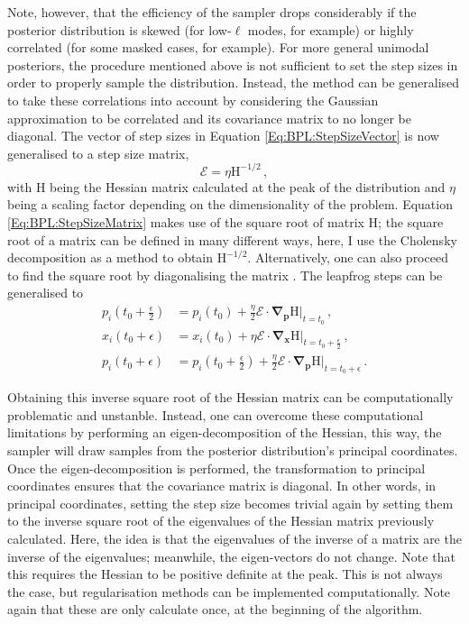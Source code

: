 \qquad Note, however, that the efficiency of the sampler drops considerably if the posterior distribution is skewed (for low-$\ell$ modes, for example) or highly correlated (for some masked cases, for example). For more general unimodal posteriors, the procedure mentioned above is not sufficient to set the step sizes in order to properly sample the distribution. Instead, the method can be generalised to take these correlations into account by considering the Gaussian approximation to be correlated and its covariance matrix to no longer be diagonal. The vector of step sizes in Equation \ref{Eq:BPL:StepSizeVector} is now generalised to a step size matrix, 
\begin{equation}
    \label{Eq:BPL:StepSizeMatrix}
    \bm{\mathcal{E}} = \eta \bm{\mathrm{H}}^{-1/2}\, ,
\end{equation}
with $\bm{\mathrm{H}}$ being the Hessian matrix calculated at the peak of the distribution and $\eta$ being a scaling factor depending on the dimensionality of the problem. Equation \ref{Eq:BPL:StepSizeMatrix} makes use of the square root of matrix $\bm{\mathrm{H}}$; the square root of a matrix can be defined in many different ways, here, I use the Cholensky decomposition \citep{Golub1996} as a method to obtain $\bm{\mathrm{H}}^{-1/2}$. Alternatively, one can also proceed to find the square root by diagonalising the matrix \citep{SreeThesis}.  The leapfrog steps can be generalised to
\begin{align}
\label{eqn::ch1_leap_forg_matrix_1}
p_i\left(t_0+\frac{\epsilon}{2}\right) & = p_i(t_0)+\frac{\eta}{2}\bm{\mathcal{E}}\cdot\mathbf{\nabla}_{\mathbf{p}}\bm{\mathrm{H}}\Big|_{t=t_0} \, ,\\
\label{eqn::ch1_leap_forg_matrix_2}
x_i(t_0+\epsilon) &= x_i(t_0)+\eta\bm{\mathcal{E}}\cdot\mathbf{\nabla}_{\mathbf{x}}\bm{\mathrm{H}}\Big|_{t=t_0+\frac{\epsilon}{2} }\, ,\\
\label{eqn::ch1_leap_forg_matrix_3}
p_i(t_0+\epsilon) & = p_i\left(t_0+\frac{\epsilon}{2}\right)+\frac{\eta}{2}\bm{\mathcal{E}}\cdot\mathbf{\nabla}_{\mathbf{p}}\bm{\mathrm{H}}\Big|_{t=t_0+\epsilon}\, .
\end{align}

\qquad Obtaining this inverse square root of the Hessian matrix can be computationally problematic and unstanble. Instead, one can overcome these computational limitations by performing an eigen-decomposition of the Hessian, this way, the sampler will draw samples from the posterior distribution's principal coordinates. Once the eigen-decomposition is performed, the transformation to principal coordinates ensures that the covariance matrix is diagonal. In other words, in principal coordinates, setting the step size becomes trivial again by setting them to the inverse square root of the eigenvalues of the Hessian matrix previously calculated. Here, the idea is that the eigenvalues of the inverse of a matrix are the inverse of the eigenvalues; meanwhile, the eigen-vectors do not change. Note that this requires the Hessian to be positive definite at the peak. This is not always the case, but regularisation methods can be implemented computationally. Note again that these are only calculate once, at the beginning of the algorithm.

